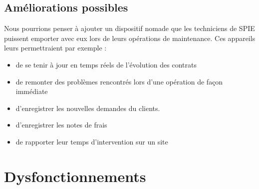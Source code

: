 \subsection{Améliorations possibles}

Nous pourrions penser à ajouter un dispositif nomade que les techniciens de SPIE puissent emporter avec eux lors de leurs opérations de maintenance. 
Ces appareils leurs permettraient par exemple :

\begin{itemize}
\item de se tenir à jour en temps réels de l'évolution des contrats
\item de remonter des problèmes rencontrés lors d'une opération de façon immédiate
\item d'enregistrer les nouvelles demandes du clients.
\item d'enregistrer les notes de frais
\item de rapporter leur temps d'intervention sur un site
\end{itemize}

\section{Dysfonctionnements}
